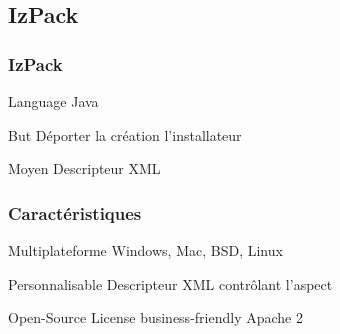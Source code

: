 \subsection{IzPack}
\begin{frame}\frametitle{IzPack}
\begin{minipage}[c]{.46\linewidth}
	\begin{beamerboxesrounded}{Language}
		Java
	\end{beamerboxesrounded}
\end{minipage}
\hfill
\begin{minipage}[c]{.46\linewidth}
	\begin{beamerboxesrounded}{But}
		Déporter la création l'installateur
	\end{beamerboxesrounded}
\end{minipage}
\vfill
\hfil
\begin{minipage}[c]{.46\linewidth}
	\begin{beamerboxesrounded}{Moyen}
	Descripteur XML
	\end{beamerboxesrounded}
\end{minipage}
\end{frame}
\begin{frame}\frametitle{Caractéristiques}
	\begin{beamerboxesrounded}{Multiplateforme}
	Windows, Mac, BSD, Linux
	\end{beamerboxesrounded}
	\vfill
	\begin{beamerboxesrounded}{Personnalisable}
	Descripteur XML contrôlant l'aspect
	\end{beamerboxesrounded}
	\vfill
	\begin{beamerboxesrounded}{Open-Source}
	License business-friendly Apache 2
	\end{beamerboxesrounded}
\end{frame}

